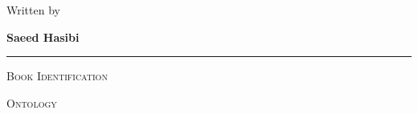 \begin{titlepage}
\begin{center}
{\normalsize
Written by
}

\vspace{0.3cm}

{\Large
\bfseries
Saeed Hasibi
}


\vfill



\rule{0.38\textwidth}{0.4pt}

\vspace{0.6cm}

{\normalsize
\textsc{Book Identification}
}

\vspace{0.3cm}

{\large
\bfseries
\BookID
}

\vspace{0.8cm}



{\normalsize
\BookSeriesTitle
}

\vspace{0.3cm}

{\small
\textsc{Ontology}
}

\vspace{0.8cm}


\end{center}

\end{titlepage}


